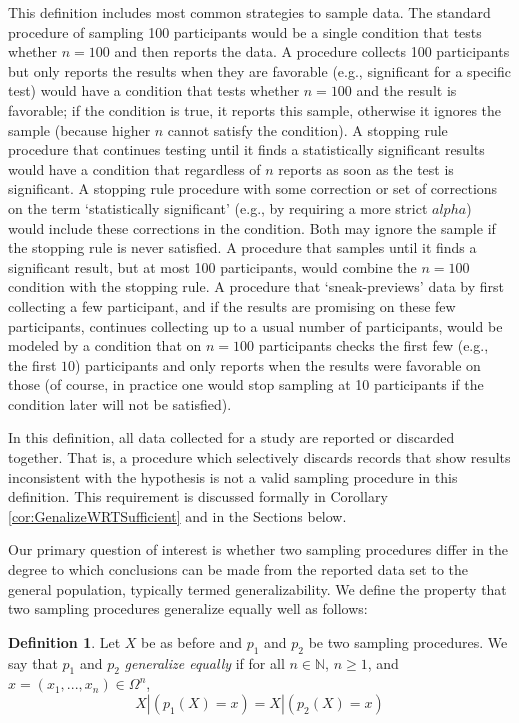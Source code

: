 \documentclass[man]{apa7}
\theoremstyle{definition}
\newtheorem{defn}[thm]{Definition}
\newcommand{\N} {\mathbb{N}}
\begin{document}
This definition includes most common strategies to sample data. The standard procedure of sampling 100 participants would be a single condition that tests whether $n=100$ and then reports the data. A procedure collects 100 participants but only reports the results when they are favorable (e.g., significant for a specific test) would have a condition that tests whether $n=100$ and the result is favorable; if the condition is true, it reports this sample, otherwise it ignores the sample (because higher $n$ cannot satisfy the condition). A stopping rule procedure that continues testing until it finds a statistically significant results would have a condition that regardless of $n$ reports as soon as the test is significant. A stopping rule procedure with some correction or set of corrections on the term `statistically significant' (e.g., by requiring a more strict $alpha$) would include these corrections in the condition. Both may ignore the sample if the stopping rule is never satisfied. A procedure that samples until it finds a significant result, but at most 100 participants, would combine the $n=100$ condition with the stopping rule. A procedure that `sneak-previews' data by first collecting a few participant, and if the results are promising on these few participants, continues collecting up to a usual number of participants, would be modeled by a condition that on $n=100$ participants checks the first few (e.g., the first $10$) participants and only reports when the results were favorable on those (of course, in practice one would stop sampling at 10 participants if the condition later will not be satisfied).

In this definition, all data collected for a study are reported or discarded together. That is, a procedure which selectively discards records that show results inconsistent with the hypothesis is not a valid sampling procedure in this definition. This requirement is discussed formally in Corollary \ref{cor:GenalizeWRTSufficient} and in the Sections below.

Our primary question of interest is whether two sampling procedures differ in the degree to which conclusions can be made from the reported data set to the general population, typically termed generalizability. We define the property that two sampling procedures generalize equally well as follows:

\begin{defn}
Let $X$ be as before and $p_1$ and $p_2$ be two sampling procedures. We say that $p_1$ and $p_2$ \emph{generalize equally} if for all $n \in \N$, $n\geq1$, and $x = (x_1,...,x_n) \in \Omega^n$,
\begin{equation} X|(p_1(X) = x) = X|(p_2(X) = x) \end{equation}
\end{defn}
\end{document}
